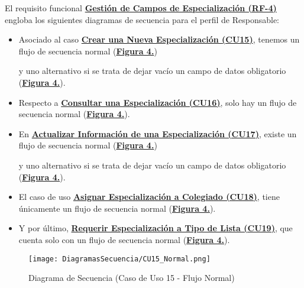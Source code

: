El requisito funcional \textbf{\hyperref[tab:rfGestEspec]{Gestión de Campos de Especialización (RF-4)}} engloba los siguientes diagramas de secuencia para el perfil de Responsable:
\begin{itemize}
  \item \addtocounter{figura_cap4}{1} Asociado al caso \textbf{\hyperref[tab:curCrearEspec]{Crear una Nueva Especialización (CU15)}}, tenemos un flujo de secuencia normal (\textbf{\hyperref[fig:Secuencia_CU15_Normal]{Figura 4.}}) \addtocounter{figura_cap4}{1} y uno alternativo si se trata de dejar vacío un campo de datos obligatorio (\textbf{\hyperref[fig:Secuencia_CU15_Alt1]{Figura 4.}}).
  \item \addtocounter{figura_cap4}{1} Respecto a \textbf{\hyperref[tab:curConsultarEspec]{Consultar una Especialización (CU16)}}, solo hay un flujo de secuencia normal (\textbf{\hyperref[fig:Secuencia_CU16_Normal]{Figura 4.}}).
  \item \addtocounter{figura_cap4}{1} En \textbf{\hyperref[tab:curActualizarEspec]{Actualizar Información de una Especialización (CU17)}}, existe un flujo de secuencia normal (\textbf{\hyperref[fig:Secuencia_CU17_Normal]{Figura 4.}}) \addtocounter{figura_cap4}{1} y uno alternativo si se trata de dejar vacío un campo de datos obligatorio (\textbf{\hyperref[fig:Secuencia_CU17_Alt1]{Figura 4.}}).
  \item \addtocounter{figura_cap4}{1} El caso de uso \textbf{\hyperref[tab:curAsignarEspecColeg]{Asignar Especialización a Colegiado (CU18)}}, tiene únicamente un flujo de secuencia normal (\textbf{\hyperref[fig:Secuencia_CU18_Normal]{Figura 4.}}).
  \item \addtocounter{figura_cap4}{1} Y por último, \textbf{\hyperref[tab:curRequerirEspecTipoLst]{Requerir Especialización a Tipo de Lista (CU19)}}, que cuenta solo con un flujo de secuencia normal (\textbf{\hyperref[fig:Secuencia_CU19_Normal]{Figura 4.}}).
\end{itemize}

\begin{landscape}
  \begin{figure}[!htbp]
    \centering
    \texttt{[image: DiagramasSecuencia/CU15\_Normal.png]}
    \caption{Diagrama de Secuencia (Caso de Uso 15 - Flujo Normal)}
    \label{fig:Secuencia_CU15_Normal}
  \end{figure}
\end{landscape}
\FloatBarrier

